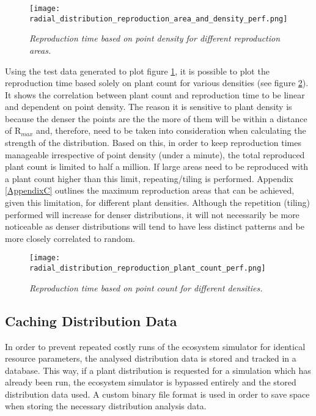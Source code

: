 \begin{figure}
\center
	\texttt{[image: radial\_distribution\_reproduction\_area\_and\_density\_perf.png]}
	\caption{ \textit{Reproduction time based on point density for different reproduction areas.}}	
	\label{fig:reproduction_density_area_perf}
\end{figure}

Using the test data generated to plot figure \ref{fig:reproduction_density_area_perf}, it is possible to plot the reproduction time based solely on plant count for various densities (see figure \ref{fig:reproduction_plant_count_perf}). It shows the correlation between plant count and reproduction time to be linear and dependent on point density. The reason it is sensitive to plant density is because the denser the points are the the more of them will be within a distance of R$_{max}$ and, therefore, need to be taken into consideration when calculating the strength of the distribution. Based on this, in order to keep reproduction times manageable irrespective of point density (under a minute), the total reproduced plant count is limited to half a million. If large areas need to be reproduced with a plant count higher than this limit, repeating/tiling is performed. Appendix \ref{AppendixC} outlines the maximum reproduction areas that can be achieved, given this limitation, for different plant densities. Although the repetition (tiling) performed will increase for denser distributions, it will not necessarily be more noticeable as denser distributions will tend to have less distinct patterns and be more closely correlated to random.\\

\begin{figure}
\center
	\texttt{[image: radial\_distribution\_reproduction\_plant\_count\_perf.png]}
	\caption{ \textit{Reproduction time based on point count for different densities.}}	
	\label{fig:reproduction_plant_count_perf}
\end{figure}

\subsection{Caching Distribution Data}

In order to prevent repeated costly runs of the ecosystem simulator for identical resource parameters, the analysed distribution data is stored and tracked in a database. This way, if a plant distribution is requested for a simulation which has already been run, the ecosystem simulator is bypassed entirely and the stored distribution data used. A custom binary file format is used in order to save space when storing the necessary distribution analysis data.


